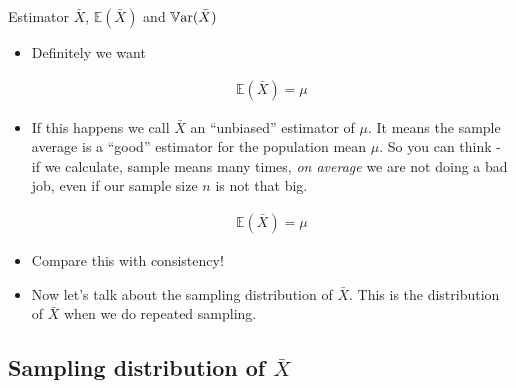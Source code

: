 \documentclass[8pt, usepdftitle=false]{beamer}
\begin{document}
\begin{frame}[allowframebreaks]{Estimator $\bar{X}$, $\mathbb{E}(\bar{X})$ and $\mathbb{V}\mathrm{ar}{(}\bar{X})$}
\begin{itemize}
\begin{itemize}
\item 3. \emph{bottom-right:} In this case the variability is not high, but the estimates are more or less always very off from the target. This is called \alert{high-bias \& low-variance} situation. This is not good, even if we have low variance.

\item 4. \emph{top-right:} This is the worst case, here the estimates are always very off from the target and also the variability is very high. This is called \alert{high-bias \& high-variance} situation.
\end{itemize}


  \item Definitely we want 

    \begin{align*}
    \mathbb{E}(\bar{X}) = \mu
  \end{align*}

  \item If this happens we call $\bar{X}$ an ``unbiased'' estimator of $\mu$. It means the sample average is a ``good'' estimator for the population mean $\mu$. So you can think - if we calculate, sample means many times, \emph{on average} we are not doing a bad job, even if our sample size $n$ is not that big.

  \begin{align*}
    \mathbb{E}(\bar{X}) = \mu
  \end{align*}


  \item Compare this with consistency!

  \item Now let's talk about the sampling distribution of $\bar{X}$. This is the distribution of $\bar{X}$ when we do repeated sampling. 



\end{itemize}
\end{frame}









\subsection{Sampling distribution of $\bar{X}$}
\frame{\subsectionpage}
\end{document}
